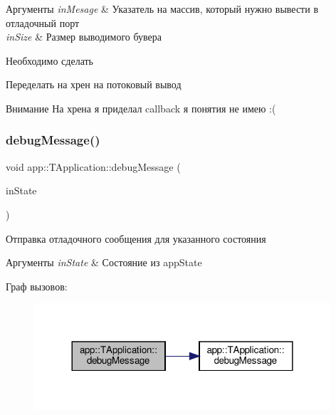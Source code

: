  
\begin{DoxyParams}{Аргументы}
{\em in\+Mesage} & Указатель на массив, который нужно вывести в отладочный порт \\
\hline
{\em in\+Size} & Размер выводимого бувера \\
\hline
\end{DoxyParams}
\begin{DoxyRefDesc}{Необходимо сделать}
\item[\hyperlink{todo__todo000002}{Необходимо сделать}]Переделать на хрен на потоковый вывод \end{DoxyRefDesc}
\begin{DoxyAttention}{Внимание}
На хрена я приделал callback я понятия не имею \+:( 
\end{DoxyAttention}
\mbox{\label{classapp_1_1_t_application_ade46529292a73f5184abb54b135c4a2e}} 
\subsubsection{\texorpdfstring{debug\+Message()}{debugMessage()}\hspace{0.1cm}{\footnotesize\ttfamily [4/4]}}
{\footnotesize\ttfamily void app\+::\+T\+Application\+::debug\+Message (\begin{DoxyParamCaption}\item[{const \hyperlink{namespaceapp_a290e8080c661e52c2f685fd4af148acf}{app\+State}}]{in\+State }\end{DoxyParamCaption})}



Отправка отладочного сообщения для указанного состояния 


\begin{DoxyParams}{Аргументы}
{\em in\+State} & Состояние из app\+State \\
\hline
\end{DoxyParams}
Граф вызовов\+:\nopagebreak
\begin{figure}[H]
\begin{center}
\leavevmode
\includegraphics[width=312pt]{classapp_1_1_t_application_ade46529292a73f5184abb54b135c4a2e_cgraph}
\end{center}
\end{figure}
\mbox{\label{classapp_1_1_t_application_aa2cb4a923a937f1a47a28fb5efe3b943}} 
